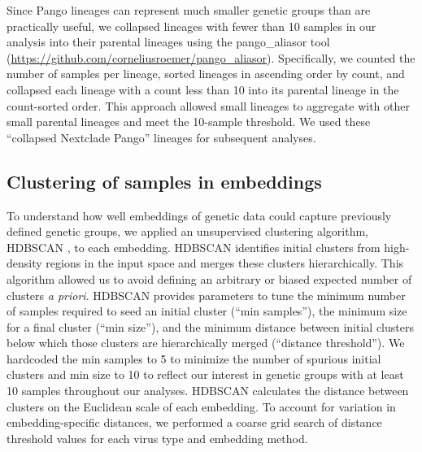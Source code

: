 \documentclass[10pt,letterpaper]{article}
\begin{document}
Since Pango lineages can represent much smaller genetic groups than are practically useful, we collapsed lineages with fewer than 10 samples in our analysis into their parental lineages using the pango\_aliasor tool (\href{https://github.com/corneliusroemer/pango_aliasor}{https://github.com/corneliusroemer/pango\_aliasor}).
Specifically, we counted the number of samples per lineage, sorted lineages in ascending order by count, and collapsed each lineage with a count less than 10 into its parental lineage in the count-sorted order.
This approach allowed small lineages to aggregate with other small parental lineages and meet the 10-sample threshold.
We used these ``collapsed Nextclade Pango'' lineages for subsequent analyses.

\subsection*{Clustering of samples in embeddings}

To understand how well embeddings of genetic data could capture previously defined genetic groups, we applied an unsupervised clustering algorithm, HDBSCAN \cite{campello2015hierarchical}, to each embedding.
HDBSCAN identifies initial clusters from high-density regions in the input space and merges these clusters hierarchically.
This algorithm allowed us to avoid defining an arbitrary or biased expected number of clusters \emph{a priori}.
HDBSCAN provides parameters to tune the minimum number of samples required to seed an initial cluster (``min samples''), the minimum size for a final cluster (``min size''), and the minimum distance between initial clusters below which those clusters are hierarchically merged (``distance threshold'').
We hardcoded the min samples to 5 to minimize the number of spurious initial clusters and min size to 10 to reflect our interest in genetic groups with at least 10 samples throughout our analyses.
HDBSCAN calculates the distance between clusters on the Euclidean scale of each embedding.
To account for variation in embedding-specific distances, we performed a coarse grid search of distance threshold values for each virus type and embedding method.
\end{document}
